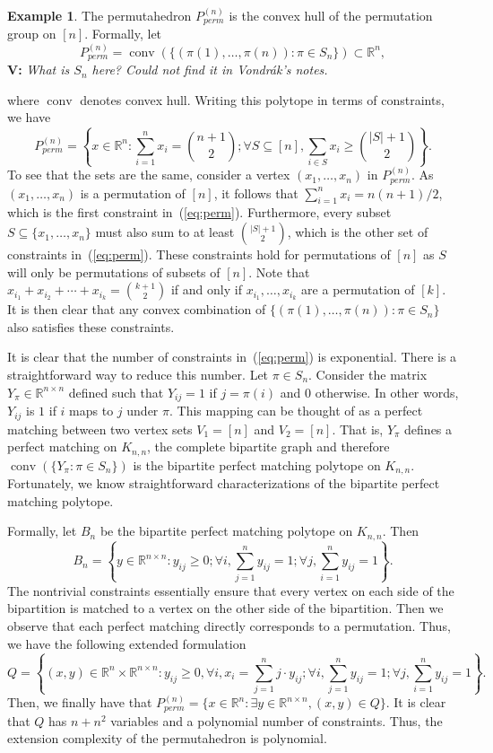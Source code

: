 \documentclass{article}
\theoremstyle{definition}
\newtheorem{example}[theorem]{Example}
\theoremstyle{remark}
\newcommand{\abs}[1]{\left|#1\right|}
\newcommand{\conv}{\operatorname{conv}}
\renewcommand{\R}{\mathbb{R}}
\newcommand{\vnote}[1]{{\color{magenta}\noindent\textbf{V: }\marginpar{****}\textit{{#1}}}}
\begin{document}
\begin{example}
The permutahedron $P_{perm}^{(n)}$ is the convex hull of the permutation group on $[n]$. Formally, let 
\[
P_{perm}^{(n)} = \conv(\{(\pi(1), \ldots, \pi(n)) : \pi \in S_n\}) \subset \R^n,
\]
\vnote{What is $S_n$ here? Could not find it in Vondr\'ak's notes.}

where $\conv$ denotes convex hull. Writing this polytope in terms of constraints, we have
\begin{equation}\label{eq:perm}
P_{perm}^{(n)} = \left\{x \in \R^n : \sum_{i=1}^n x_i = \binom{n+1}{2}; \forall S \subseteq [n], \sum_{i\in S} x_i \ge \binom{\abs{S} + 1}{2}\right\}.
\end{equation}
To see that the sets are the same, consider a vertex $(x_1, \ldots, x_n)$ in $P_{perm}^{(n)}$. As $(x_1, \ldots, x_n)$ is a permutation of $[n]$, it follows that $\sum_{i=1}^n x_i = n(n+1)/2$, which is the first constraint in~(\ref{eq:perm}). Furthermore, every subset $S \subseteq \{x_1, \ldots, x_n\}$ must also sum to at least $\binom{\abs{S} + 1}{2}$, which is the other set of constraints in~(\ref{eq:perm}). These constraints hold for permutations of $[n]$ as $S$ will only be permutations of subsets of $[n]$. Note that $x_{i_1} + x_{i_2} + \cdots + x_{i_k} = \binom{k + 1}{2}$ if and only if $x_{i_1}, \ldots, x_{i_k}$ are a permutation of $[k]$. It is then clear that any convex combination of $\{(\pi(1), \ldots, \pi(n)) : \pi \in S_n\}$ also satisfies these constraints.

It is clear that the number of constraints in~(\ref{eq:perm}) is exponential. There is a straightforward way to reduce this number. Let $\pi \in S_n$. Consider the matrix $Y_\pi \in \R^{n \times n}$ defined such that $Y_{ij} = 1$ if $j = \pi(i)$ and $0$ otherwise. In other words, $Y_{ij}$ is $1$ if $i$ maps to $j$ under $\pi$. This mapping can be thought of as a perfect matching between two vertex sets $V_1 = [n]$ and $V_2 = [n]$. That is, $Y_\pi$ defines a perfect matching on $K_{n,n}$, the complete bipartite graph and therefore $\conv(\{Y_\pi : \pi \in S_n\})$ is the bipartite perfect matching polytope on $K_{n,n}$. Fortunately, we know straightforward characterizations of the bipartite perfect matching polytope. 

Formally, let $B_{n}$ be the bipartite perfect matching polytope on $K_{n,n}$. Then 
\[
B_n = \left\{ y \in \R^{n \times n} : y_{ij} \ge 0; \forall i, \sum_{j=1}^n y_{ij} = 1; \forall j, \sum_{i=1}^n y_{ij} = 1\right\}.
\]
The nontrivial constraints essentially ensure that every vertex on each side of the bipartition is matched to a vertex on the other side of the bipartition. Then we observe that each perfect matching directly corresponds to a permutation. Thus, we have the following extended formulation
\[
Q = \left\{(x,y) \in \R^n \times \R^{n \times n} : y_{ij} \ge 0, \forall i, x_i = \sum_{j=1}^n j \cdot y_{ij}; \forall i, \sum_{j=1}^n y_{ij} = 1; \forall j, \sum_{i=1}^n y_{ij} = 1\right\}.
\]
Then, we finally have that $P_{perm}^{(n)} = \{x \in \R^n : \exists y \in \R^{n \times n}, (x,y) \in Q\}$. It is clear that $Q$ has $n + n^2$ variables and a polynomial number of constraints. Thus, the extension complexity of the permutahedron is polynomial. 
\end{example}
\end{document}
